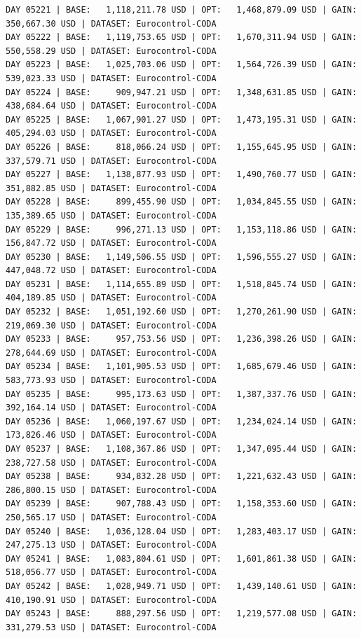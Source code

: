 \documentclass[11pt,a4paper]{article}
\begin{document}
\begin{verbatim}
DAY 05221 | BASE:   1,118,211.78 USD | OPT:   1,468,879.09 USD | GAIN: 350,667.30 USD | DATASET: Eurocontrol-CODA
DAY 05222 | BASE:   1,119,753.65 USD | OPT:   1,670,311.94 USD | GAIN: 550,558.29 USD | DATASET: Eurocontrol-CODA
DAY 05223 | BASE:   1,025,703.06 USD | OPT:   1,564,726.39 USD | GAIN: 539,023.33 USD | DATASET: Eurocontrol-CODA
DAY 05224 | BASE:     909,947.21 USD | OPT:   1,348,631.85 USD | GAIN: 438,684.64 USD | DATASET: Eurocontrol-CODA
DAY 05225 | BASE:   1,067,901.27 USD | OPT:   1,473,195.31 USD | GAIN: 405,294.03 USD | DATASET: Eurocontrol-CODA
DAY 05226 | BASE:     818,066.24 USD | OPT:   1,155,645.95 USD | GAIN: 337,579.71 USD | DATASET: Eurocontrol-CODA
DAY 05227 | BASE:   1,138,877.93 USD | OPT:   1,490,760.77 USD | GAIN: 351,882.85 USD | DATASET: Eurocontrol-CODA
DAY 05228 | BASE:     899,455.90 USD | OPT:   1,034,845.55 USD | GAIN: 135,389.65 USD | DATASET: Eurocontrol-CODA
DAY 05229 | BASE:     996,271.13 USD | OPT:   1,153,118.86 USD | GAIN: 156,847.72 USD | DATASET: Eurocontrol-CODA
DAY 05230 | BASE:   1,149,506.55 USD | OPT:   1,596,555.27 USD | GAIN: 447,048.72 USD | DATASET: Eurocontrol-CODA
DAY 05231 | BASE:   1,114,655.89 USD | OPT:   1,518,845.74 USD | GAIN: 404,189.85 USD | DATASET: Eurocontrol-CODA
DAY 05232 | BASE:   1,051,192.60 USD | OPT:   1,270,261.90 USD | GAIN: 219,069.30 USD | DATASET: Eurocontrol-CODA
DAY 05233 | BASE:     957,753.56 USD | OPT:   1,236,398.26 USD | GAIN: 278,644.69 USD | DATASET: Eurocontrol-CODA
DAY 05234 | BASE:   1,101,905.53 USD | OPT:   1,685,679.46 USD | GAIN: 583,773.93 USD | DATASET: Eurocontrol-CODA
DAY 05235 | BASE:     995,173.63 USD | OPT:   1,387,337.76 USD | GAIN: 392,164.14 USD | DATASET: Eurocontrol-CODA
DAY 05236 | BASE:   1,060,197.67 USD | OPT:   1,234,024.14 USD | GAIN: 173,826.46 USD | DATASET: Eurocontrol-CODA
DAY 05237 | BASE:   1,108,367.86 USD | OPT:   1,347,095.44 USD | GAIN: 238,727.58 USD | DATASET: Eurocontrol-CODA
DAY 05238 | BASE:     934,832.28 USD | OPT:   1,221,632.43 USD | GAIN: 286,800.15 USD | DATASET: Eurocontrol-CODA
DAY 05239 | BASE:     907,788.43 USD | OPT:   1,158,353.60 USD | GAIN: 250,565.17 USD | DATASET: Eurocontrol-CODA
DAY 05240 | BASE:   1,036,128.04 USD | OPT:   1,283,403.17 USD | GAIN: 247,275.13 USD | DATASET: Eurocontrol-CODA
DAY 05241 | BASE:   1,083,804.61 USD | OPT:   1,601,861.38 USD | GAIN: 518,056.77 USD | DATASET: Eurocontrol-CODA
DAY 05242 | BASE:   1,028,949.71 USD | OPT:   1,439,140.61 USD | GAIN: 410,190.91 USD | DATASET: Eurocontrol-CODA
DAY 05243 | BASE:     888,297.56 USD | OPT:   1,219,577.08 USD | GAIN: 331,279.53 USD | DATASET: Eurocontrol-CODA

\end{verbatim}
\end{document}
